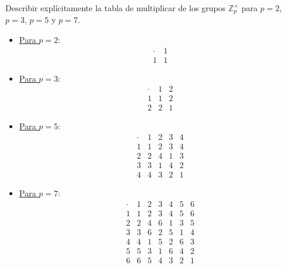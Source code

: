 \begin{ejercicio}\label{ej:2.2}
    Describir explícitamente la tabla de multiplicar de los grupos $\mathbb{Z}^{\times}_p$ para $p = 2$, $p = 3$, $p = 5$ y $p = 7$.
    \begin{itemize}
        \item \ul{Para $p = 2$}:
        \begin{equation*}
            \begin{array}{c|c}
                \cdot & 1 \\ \hline
                1 & 1
            \end{array}
        \end{equation*}

        \item \ul{Para $p = 3$}:
        \begin{equation*}
            \begin{array}{c|cc}
                \cdot & 1 & 2 \\ \hline
                1 & 1 & 2 \\
                2 & 2 & 1
            \end{array}
        \end{equation*}

        \item \ul{Para $p = 5$}:
        \begin{equation*}
            \begin{array}{c|cccc}
                \cdot & 1 & 2 & 3 & 4 \\ \hline
                1 & 1 & 2 & 3 & 4 \\
                2 & 2 & 4 & 1 & 3 \\
                3 & 3 & 1 & 4 & 2 \\
                4 & 4 & 3 & 2 & 1
            \end{array}
        \end{equation*}

        \item \ul{Para $p = 7$}:
        \begin{equation*}
            \begin{array}{c|ccccccc}
                \cdot & 1 & 2 & 3 & 4 & 5 & 6 \\ \hline
                1 & 1 & 2 & 3 & 4 & 5 & 6 \\
                2 & 2 & 4 & 6 & 1 & 3 & 5 \\
                3 & 3 & 6 & 2 & 5 & 1 & 4 \\
                4 & 4 & 1 & 5 & 2 & 6 & 3 \\
                5 & 5 & 3 & 1 & 6 & 4 & 2 \\
                6 & 6 & 5 & 4 & 3 & 2 & 1
            \end{array}
        \end{equation*}
    \end{itemize}
\end{ejercicio}

